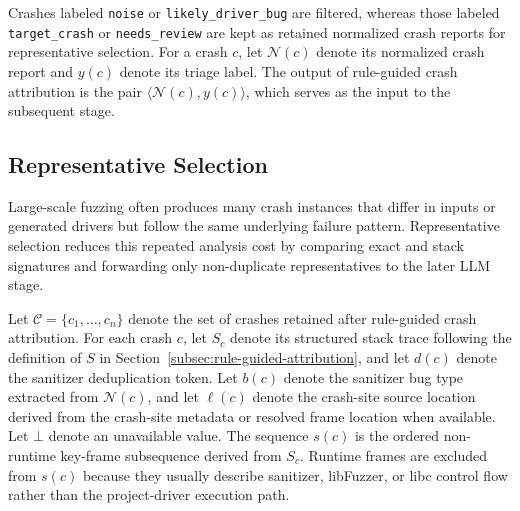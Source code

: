 \documentclass[pdflatex,sn-basic]{sn-jnl}%
\theoremstyle{thmstyleone}%
\theoremstyle{thmstyletwo}%
\theoremstyle{thmstylethree}%
\begin{document}
Crashes labeled \texttt{noise} or \texttt{likely\_driver\_bug} are filtered, whereas those labeled \texttt{target\_crash} or \texttt{needs\_review} are kept as retained normalized crash reports for representative selection.
For a crash \(c\), let \(\mathcal{N}(c)\) denote its normalized crash report and \(y(c)\) denote its triage label.
The output of rule-guided crash attribution is the pair \(\langle\mathcal{N}(c),y(c)\rangle\), which serves as the input to the subsequent stage.


\subsection{Representative Selection}

Large-scale fuzzing often produces many crash instances that differ in inputs or generated drivers but follow the same underlying failure pattern.
Representative selection reduces this repeated analysis cost by comparing exact and stack signatures and forwarding only non-duplicate representatives to the later LLM stage.

Let \(\mathcal{C}=\{c_1,\ldots,c_n\}\) denote the set of crashes retained after rule-guided crash attribution.
For each crash \(c\), let \(S_c\) denote its structured stack trace following the definition of \(S\) in Section~\ref{subsec:rule-guided-attribution}, and let \(d(c)\) denote the sanitizer deduplication token.
Let \(b(c)\) denote the sanitizer bug type extracted from \(\mathcal{N}(c)\), and let \(\ell(c)\) denote the crash-site source location derived from the crash-site metadata or resolved frame location when available.
Let \(\bot\) denote an unavailable value.
The sequence \(s(c)\) is the ordered non-runtime key-frame subsequence derived from \(S_c\).
Runtime frames are excluded from \(s(c)\) because they usually describe sanitizer, libFuzzer, or libc control flow rather than the project-driver execution path.
\end{document}

